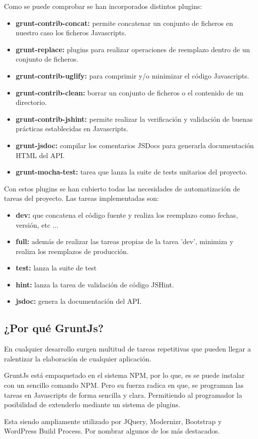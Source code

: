 Como se puede comprobar se han incorporados distintos plugins:

\begin{itemize}
\item \textbf{grunt-contrib-concat:} permite concatenar un conjunto de ficheros en nuestro caso los ficheros Javascripts.
\item \textbf{grunt-replace:} plugins para realizar operaciones de reemplazo dentro de un conjunto de ficheros.
\item \textbf{grunt-contrib-uglify:} para comprimir y/o minimizar el código Javascripts.
\item \textbf{grunt-contrib-clean:} borrar un conjunto de ficheros o el contenido de un directorio.
\item \textbf{grunt-contrib-jshint:} permite realizar la verificación y validación de buenas prácticas establecidas en Javascripts.
\item \textbf{grunt-jsdoc:} compilar los comentarios JSDocs para generarla documentación HTML del API.
\item \textbf{grunt-mocha-test:} tarea que lanza la suite de tests unitarios del proyecto.
\end{itemize}

Con estos plugins se han cubierto todas las necesidades de automatización de tareas del proyecto. Las tareas implementadas son:

\begin{itemize}
\item \textbf{dev:} que concatena el código fuente y realiza los reemplazo como fechas, versión, etc ...
\item \textbf{full:} además de realizar las tareas propias de la tarea 'dev', minimiza y realiza los reemplazos de producción.
\item \textbf{test:} lanza la suite de test
\item \textbf{hint:} lanza la tarea de validación de código JSHint.
\item \textbf{jsdoc:} genera la documentación del API.
\end{itemize}

\subsection{¿Por qué GruntJs?}
En cualquier desarrollo surgen multitud de tareas repetitivas que pueden llegar a ralentizar la elaboración de cualquier aplicación. 

GruntJs está empaquetado en el sistema NPM, por lo que, es se puede instalar con un sencillo comando NPM. Pero su fuerza radica en que, se programan las tareas en Javascripts de forma sencilla y clara. Permitiendo al programador la posibilidad de extenderlo mediante un sistema de plugins. 

Esta siendo ampliamente utilizado por JQuery, Modernizr, Bootstrap y WordPress Build Process. Por nombrar algunos de los más destacados.  
